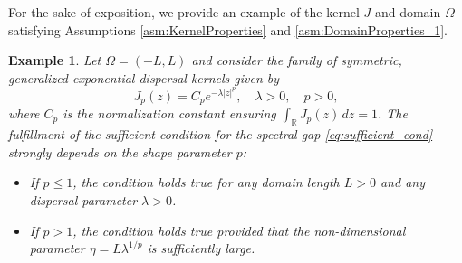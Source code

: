 \documentclass[12pt, a4paper]{article}
\theoremstyle{break}
\theoremstyle{break}
\theoremstyle{break}
\theoremstyle{break}
\theoremstyle{break}
\theoremstyle{break}
\theoremstyle{break}
\theoremstyle{break}
\theoremstyle{break}
\newtheorem{example}{Example}[section]
\begin{document}
For the sake of exposition, we provide an example of the kernel $J$ and domain $\Omega$ satisfying Assumptions \ref{asm:KernelProperties} and \ref{asm:DomainProperties_1}.
\begin{example}
    \label{ex:generalized_exponential}
    Let $\Omega = (-L, L)$ and consider the family of symmetric, generalized exponential dispersal kernels given by
    \begin{equation}
        J_p(z) = C_p e^{-\lambda |z|^p}, \quad \lambda > 0, \quad p > 0,
    \end{equation}
    where $C_p$ is the normalization constant ensuring $\int_{\mathbb{R}} J_p(z) \, dz = 1$. The fulfillment of the sufficient condition for the spectral gap \eqref{eq:sufficient_cond} strongly depends on the shape parameter $p$:
    \begin{itemize}
        \item If $p \le 1$, the condition holds true for any domain length $L > 0$ and any dispersal parameter $\lambda > 0$.
        \item If $p > 1$, the condition holds true provided that the non-dimensional parameter $\eta = L\lambda^{1/p}$ is sufficiently large.
    \end{itemize}
\end{example}
\end{document}
